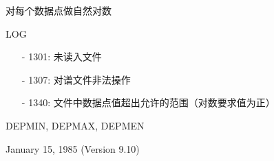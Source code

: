 \label{cmd:log}

对每个数据点做自然对数

LOG

\begin{itemize}
\item[-]1301: 未读入文件
\item[-]1307: 对谱文件非法操作
\item[-]1340: 文件中数据点值超出允许的范围（对数要求值为正）
\end{itemize}

DEPMIN, DEPMAX, DEPMEN

January 15, 1985 (Version 9.10)

